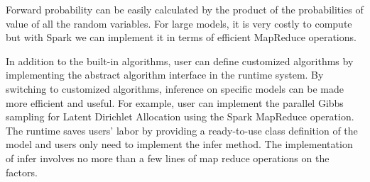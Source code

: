 {Forward probability can be easily calculated by the product of the probabilities of value of all the random
variables. For large models, it is very costly to compute but with Spark we can implement it in terms of
efficient MapReduce operations.

In addition to the built-in algorithms, user can define customized algorithms by implementing the abstract algorithm interface in the runtime system. By switching to customized algorithms, inference on specific models can be made more efficient and useful. For example, user can implement the parallel Gibbs sampling \cite{wang2009plda} for Latent Dirichlet Allocation \cite{blei2003latent} using the Spark MapReduce operation. The runtime saves users' labor by providing a ready-to-use class definition of the model and users only need to implement the infer method. The implementation of infer involves no more than a few lines of map reduce operations on the factors.

}%
